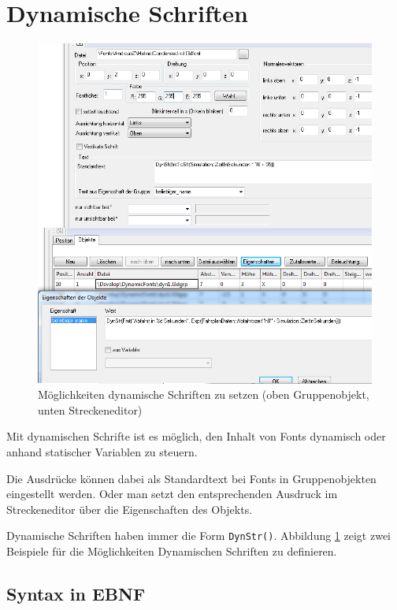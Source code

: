 \section{Dynamische Schriften}
\label{sec:editor-obj-dynstr}

\begin{figure}[h]
\centering
\includegraphics[width=1.0\textwidth]{editor/images/dynamische_schrift.png}
\caption{Möglichkeiten dynamische Schriften zu setzen (oben Gruppenobjekt, unten Streckeneditor)}
\label{fig:editor:dynstr}
\end{figure}

Mit dynamischen Schrifte ist es möglich, den Inhalt von Fonts dynamisch
oder anhand statischer Variablen zu steuern.

Die Ausdrücke können dabei als Standardtext bei Fonts in Gruppenobjekten
eingestellt werden. Oder man setzt den entsprechenden Ausdruck im
Streckeneditor über die Eigenschaften des Objekts.

Dynamische Schriften haben immer die Form \texttt{DynStr()}. Abbildung \ref{fig:editor:dynstr} zeigt zwei Beispiele für die Möglichkeiten Dynamischen Schriften zu definieren.

\subsection{Syntax in EBNF}

